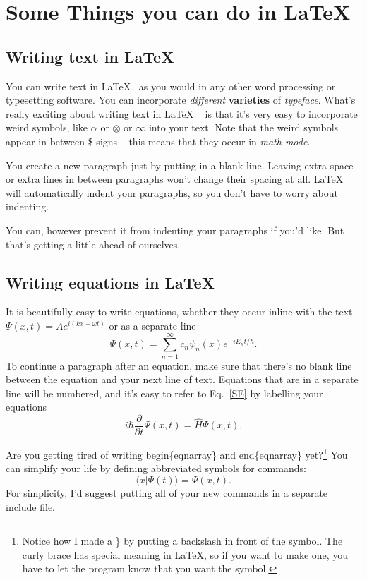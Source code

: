\documentclass[../main]{subfiles}
\begin{document}
\chapter{Some Things you can do in \LaTeX}
\section{Writing text in \LaTeX}
You can write text in \LaTeX ~ as you would in any other word processing or typesetting software.  You can incorporate \textit{different} \textbf{varieties} of \textsl{typeface}.  What's really exciting about writing text in \LaTeX 
~ is that it's very easy to incorporate weird symbols, like $\alpha$ or $\otimes$ or $\infty$ into your text.  Note that the weird symbols appear in between \$ signs -- this means that they occur in \textit{math mode}.

You create a new paragraph just by putting in a blank line.  Leaving extra space or extra lines in between paragraphs won't change their spacing at all.  \LaTeX ~ will automatically indent your paragraphs, so you don't have to worry about indenting.

\noindent You can, however prevent it from indenting your paragraphs if you'd like.  But that's getting a little ahead of ourselves.  

\section{Writing equations in \LaTeX}
It is beautifully easy to write equations, whether they occur inline with the text  $\Psi(x,t) = A e^{i(kx -\omega t)}$ or as a separate line
\begin{equation}
\Psi(x,t) =\sum_{n=1}^\infty c_n \psi_n(x) e^{-i E_n t/\hbar}.
\end{equation}
To continue a paragraph after an equation, make sure that there's no blank line between the equation and your next line of text.
Equations that are in a separate line will be numbered, and it's easy to refer to Eq.~\ref{SE} by labelling your equations  
\begin{equation}
i\hbar\frac{\partial}{\partial t}\Psi(x,t) = \hat{H} \Psi(x,t). 
\label{SE}
\end{equation}

Are you getting tired of writing begin\{eqnarray\} and end\{eqnarray\} yet?\footnote{Notice how I made a \} by putting a backslash in front of the symbol.  The curly brace has special meaning in \LaTeX, so if you want to make one, you have to let the program know that you want the symbol.}  You can simplify your life by defining abbreviated symbols for commands:
\newcommand{\beq}{\begin{equation}}
\newcommand{\eeq}{\end{equation}}
\beq
\langle x |\Psi(t)\rangle = \Psi(x,t).
\eeq
For simplicity, I'd suggest putting all of your new commands in a separate include file.
\end{document}
